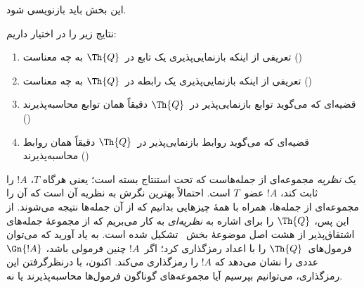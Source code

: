 \documentclass[../../../include/open-logic-section]{subfiles}
\begin{document}


\begin{editorial}
این بخش باید بازنویسی شود.
\end{editorial}

نتایج زیر را در اختیار داریم:
\begin{enumerate}
\item تعریفی از اینکه بازنمایی‌پذیری یک تابع در~$\Th{Q}$ به چه معناست
  ()
\item تعریفی از اینکه بازنمایی‌پذیری یک رابطه در~$\Th{Q}$ به چه معناست
  ()
\item قضیه‌ای که می‌گوید توابع بازنمایی‌پذیر در~$\Th{Q}$ دقیقاً همان
  توابع محاسبه‌پذیرند
  ()
\item قضیه‌ای که می‌گوید روابط بازنمایی‌پذیر در~$\Th{Q}$ دقیقاً همان
  روابط محاسبه‌پذیرند
  ()
\end{enumerate}

یک {\em نظریه} مجموعه‌ای از جمله‌هاست که تحت استنتاج بسته است؛ یعنی
هرگاه $T$، $!A$ را ثابت کند، $!A$ عضو~$T$ است. احتمالاً بهترین نگرش
به نظریه آن است که آن را مجموعه‌ای از جمله‌ها، همراه با همهٔ چیزهایی
بدانیم که از آن جمله‌ها نتیجه می‌شوند. از این پس، $\Th{Q}$ را برای
اشاره به {\em نظریه‌ای} به کار می‌بریم که از مجموعهٔ جمله‌های
اشتقاق‌پذیر از هشت اصل موضوعهٔ بخش~ تشکیل شده
است. به یاد آورید که می‌توان فرمول‌های~$\Th{Q}$ را با اعداد رمزگذاری
کرد؛ اگر~$!A$ چنین فرمولی باشد، $\Gn{!A}$ عددی را نشان می‌دهد که
$!A$ را رمزگذاری می‌کند. اکنون، با درنظرگرفتن این رمزگذاری، می‌توانیم
بپرسیم آیا مجموعه‌های گوناگون فرمول‌ها محاسبه‌پذیرند یا نه.
\end{document}
